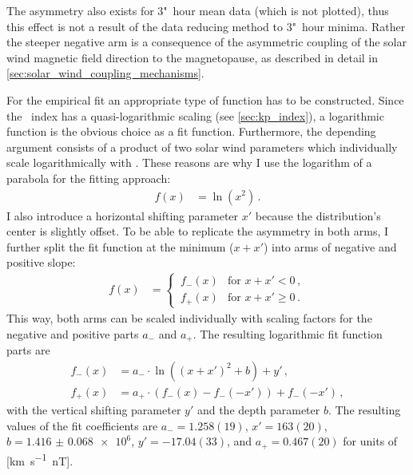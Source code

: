 The asymmetry also exists for 3"~hour mean data (which is not plotted), thus this effect is not a result of the data reducing method to 3"~hour minima. Rather the steeper negative arm is a consequence of the asymmetric coupling of the solar wind magnetic field direction to the magnetopause, as described in detail in \autoref{sec:solar_wind_coupling_mechanisms}.

For the empirical fit an appropriate type of function has to be constructed. Since the \Kp~index has a quasi-logarithmic scaling (see \autoref{sec:kp_index}), a logarithmic function is the obvious choice as a fit function. Furthermore, the depending argument consists of a product of two solar wind parameters which individually scale logarithmically with \Kp{}. These reasons are why I use the logarithm of a parabola for the fitting approach:
\begin{align}
	f(x) &= \ln\left(x^2\right)	\,.	\label{eq:log_square_function}
\end{align}
I also introduce a horizontal shifting parameter $x'$ because the distribution's center is slightly offset. To be able to replicate the asymmetry in both arms, I further split the fit function at the minimum ($x + x'$) into arms of negative and positive slope:
\begin{align}
	f(x) &=
	\begin{cases}
		\,f_-(x) &\text{for } x + x' < 0	\,,\\
		\,f_+(x) &\text{for } x + x' \ge 0	\,.
	\end{cases}	\label{eq:log_square_fit_function}
\end{align}
This way, both arms can be scaled individually with scaling factors for the negative and positive parts $a_-$ and $a_+$. The resulting logarithmic fit function parts are
\begin{align}
	f_-(x) &= a_- \cdot \ln\left(\left(x + x'\right)^2 + b\right) + y'	\,,\\
	f_+(x) &= a_+ \cdot \left(f_-(x) - f_-\left(-x'\right)\right) + f_-\left(-x'\right)	\,,
\end{align}
with the vertical shifting parameter $y'$ and the depth parameter $b$. The resulting values of the fit coefficients are \mbox{$a_- = 1.258(19)$}, $x' = 163(20)$, $b = \num{1.416(68)e6}$, $y' = -17.04(33)$, and \mbox{$a_+ = 0.467(20)$} for units of [\si{\km\per\s \nano\tesla}].
